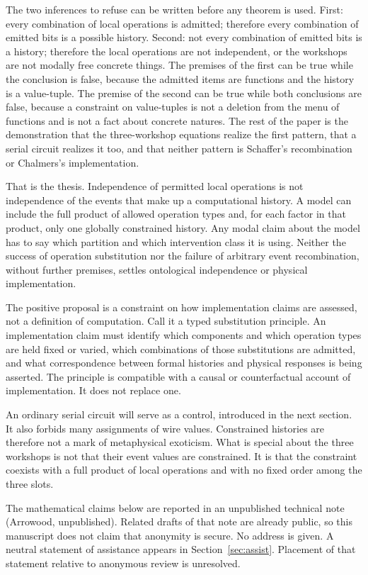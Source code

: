 \documentclass[12pt]{article}
\begin{document}
The two inferences to refuse can be written before any theorem is used. First: every combination of local operations is admitted; therefore every combination of emitted bits is a possible history. Second: not every combination of emitted bits is a history; therefore the local operations are not independent, or the workshops are not modally free concrete things. The premises of the first can be true while the conclusion is false, because the admitted items are functions and the history is a value-tuple. The premise of the second can be true while both conclusions are false, because a constraint on value-tuples is not a deletion from the menu of functions and is not a fact about concrete natures. The rest of the paper is the demonstration that the three-workshop equations realize the first pattern, that a serial circuit realizes it too, and that neither pattern is Schaffer's recombination or Chalmers's implementation.

That is the thesis. Independence of permitted local operations is not independence of the events that make up a computational history. A model can include the full product of allowed operation types and, for each factor in that product, only one globally constrained history. Any modal claim about the model has to say which partition and which intervention class it is using. Neither the success of operation substitution nor the failure of arbitrary event recombination, without further premises, settles ontological independence or physical implementation.

The positive proposal is a constraint on how implementation claims are assessed, not a definition of computation. Call it a typed substitution principle. An implementation claim must identify which components and which operation types are held fixed or varied, which combinations of those substitutions are admitted, and what correspondence between formal histories and physical responses is being asserted. The principle is compatible with a causal or counterfactual account of implementation. It does not replace one.

An ordinary serial circuit will serve as a control, introduced in the next section. It also forbids many assignments of wire values. Constrained histories are therefore not a mark of metaphysical exoticism. What is special about the three workshops is not that their event values are constrained. It is that the constraint coexists with a full product of local operations and with no fixed order among the three slots.

The mathematical claims below are reported in an unpublished technical note (Arrowood, unpublished). Related drafts of that note are already public, so this manuscript does not claim that anonymity is secure. No address is given. A neutral statement of assistance appears in Section~\ref{sec:assist}. Placement of that statement relative to anonymous review is unresolved.
\end{document}
